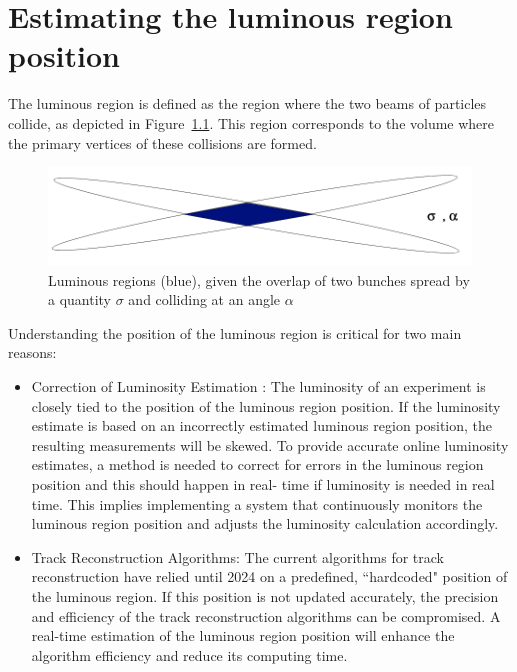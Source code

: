 \chapter{Estimating the luminous region position}\label{chap:beamline}
The luminous region is defined as the region where the two beams of particles collide, as depicted in Figure~\ref{fig:luminous-region}. This region corresponds to the volume where the primary vertices of these collisions are formed.



\begin{figure}
    \centering
    \includegraphics[width=\textwidth]{figures/luminous_region.png}
    \caption{Luminous regions (blue), given the overlap of two bunches spread by a quantity $\sigma$ and colliding at an angle $\alpha$}
    \label{fig:luminous-region}
\end{figure}



Understanding the position of the luminous region is critical for two main reasons:
\begin{itemize}
\item Correction of Luminosity Estimation : The luminosity of an experiment is closely tied to the position of the luminous region position. If the luminosity estimate is based on an incorrectly estimated luminous region position, the resulting measurements will be skewed. To provide accurate online luminosity estimates, a method is needed to correct for errors in the luminous region position and this should happen in real- time if luminosity is needed in real time. This implies implementing a system that continuously monitors the luminous region position and adjusts the luminosity calculation accordingly.
\item Track Reconstruction Algorithms: The current algorithms for track reconstruction have relied until 2024 on a predefined, ``hardcoded" position of the luminous region. If this position is not updated accurately, the precision and efficiency of the track reconstruction algorithms can be compromised. A real-time estimation of the luminous region position will enhance the algorithm efficiency and reduce its computing time.
\end{itemize}

